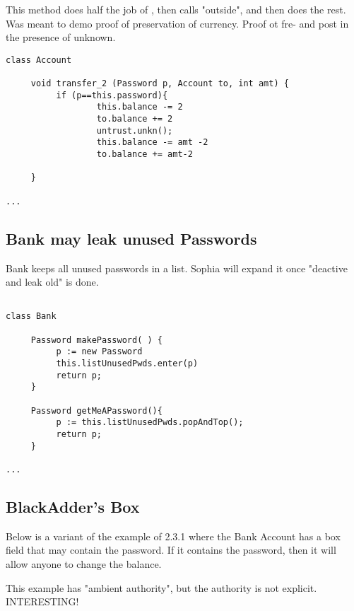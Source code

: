 This method  does half the job of  , then calls "outside", and then does the rest. Was meant to demo proof of preservation of currency. Proof ot fre- and post in the presence of unknown.

\begin{lstlisting}[language=chainmail, mathescape=true, frame=lines]
class Account

     void transfer_2 (Password p, Account to, int amt) {
          if (p==this.password){
                  this.balance -= 2
                  to.balance += 2
                  untrust.unkn();
                  this.balance -= amt -2
                  to.balance += amt-2
                     
     }
     
...
\end{lstlisting}

\subsection{Bank may leak unused Passwords}
\label{s:deactivate_leak_old}

Bank keeps all unused passwords in a list.  Sophia will expand it once "deactive and leak old" is done.

\begin{lstlisting}[language=chainmail, mathescape=true, frame=lines]

class Bank

     Password makePassword( ) {
          p := new Password
          this.listUnusedPwds.enter(p) 
          return p;                    
     }
     
     Password getMeAPassword(){
          p := this.listUnusedPwds.popAndTop();
          return p;
     }
     
...
\end{lstlisting}

\subsection{BlackAdder's Box}
\label{s:blackadder_box}

Below is a variant of the example of 2.3.1 where the Bank Account has a box field 
that may contain the password. If it contains the password, then it will allow anyone to change the balance.

This example has "ambient authority", but the authority is not explicit. INTERESTING!

